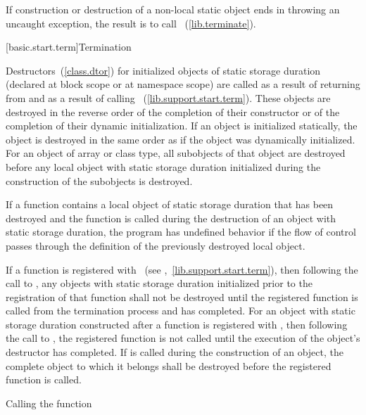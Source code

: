 \pnum
If construction or destruction of a non-local static object ends
in throwing an uncaught exception, the result is to call
~(\ref{lib.terminate}).%

[basic.start.term]{Termination}

\pnum
{}%
%
%
Destructors~(\ref{class.dtor}) for initialized objects
of static storage duration (declared at block scope or at namespace scope)
are called as a result of returning from  and as a result of calling
%
%
~(\ref{lib.support.start.term}).
These objects are destroyed in the reverse order of the completion of
their constructor or of the completion of their dynamic initialization.
If an object is
initialized statically, the object is destroyed in the same order as if
the object was dynamically initialized. For an object of array or class
type, all subobjects of that object are destroyed before any local
object with static storage duration initialized during the construction
of the subobjects is destroyed.

\pnum
If a function contains a local object of static storage duration that has been
destroyed and the function is called during the destruction of an object with static
storage duration, the program has undefined behavior if the flow of control
passes through the definition of the previously destroyed local object.

\pnum
{}%
%
If a function is registered with ~(see
,~\ref{lib.support.start.term}), then following the call to
, any objects with static storage duration initialized prior
to the registration of that function shall not be destroyed until the
registered function is called from the termination process and has
completed. For an object with static storage duration constructed after
a function is registered with , then following the
call to , the registered function is not called until the
execution of the object's destructor has completed. If 
is called during the construction of an object, the complete object to
which it belongs shall be destroyed before the registered function is called.

\pnum
{}%
%
%
Calling the function

